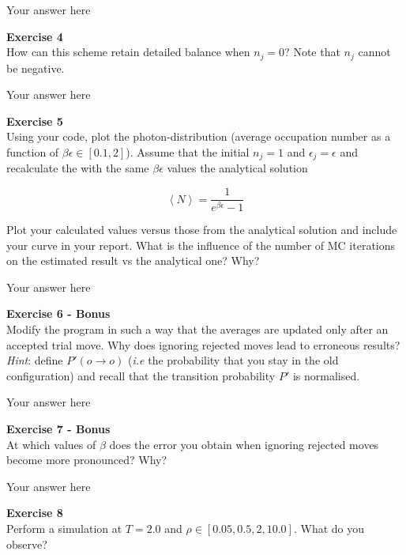 \documentclass{article}
\begin{document}
Your answer here

\begin{mdframed}
\textbf{Exercise 4}\\
How can this scheme retain detailed balance when $n_j = 0$? Note that $n_j$  cannot be negative.
\end{mdframed}

Your answer here

\begin{mdframed}
\textbf{Exercise 5}\\
Using your code, plot the photon-distribution (average occupation number as a function of $\beta\epsilon\in[0.1,2]$).
Assume that the initial $n_j =1$ and $\epsilon_j=\epsilon$ and recalculate the with the same $\beta\epsilon$ values the analytical solution

\begin{equation}
\left< N \right> = \frac{1}{e^{\beta\epsilon}-1}
\end{equation}


Plot your calculated values versus those from the analytical solution and include your curve in your report. What is the influence of the number of MC iterations on the estimated result vs the analytical one? Why?
\end{mdframed}

Your answer here

\begin{mdframed}
\textbf{Exercise 6 - Bonus}\\
Modify the program in such a way that the averages are updated only after an accepted trial move. Why does ignoring rejected moves lead to erroneous results? \textit{Hint}: define $P'(o \rightarrow o)$ (\textit{i.e}  the probability that you stay in the old configuration) and recall that the transition probability $P'$ is normalised.
\end{mdframed}

Your answer here

\begin{mdframed}
\textbf{Exercise 7 - Bonus}\\
At which values of $\beta$ does the error you obtain when ignoring rejected moves become more pronounced? Why?
\end{mdframed}

Your answer here

\begin{mdframed}
\textbf{Exercise 8}\\
Perform a simulation at $T = 2.0$ and $\rho \in [0.05, 0.5, 2, 10.0]$. What do you observe?
\end{mdframed}
\end{document}
